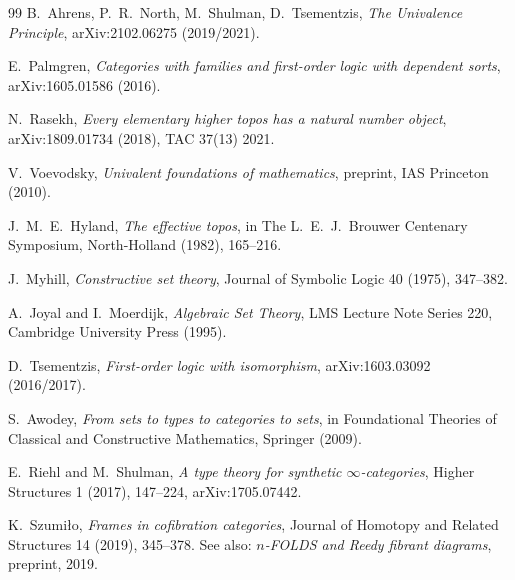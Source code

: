 \documentclass[12pt]{article}
\theoremstyle{definition}
\theoremstyle{remark}
\begin{document}
\begin{thebibliography}{99}
B.\ Ahrens, P.\ R.\ North, M.\ Shulman, D.\ Tsementzis,
\emph{The Univalence Principle},
arXiv:2102.06275 (2019/2021).

E.\ Palmgren,
\emph{Categories with families and first-order logic with dependent sorts},
arXiv:1605.01586 (2016).

N.\ Rasekh,
\emph{Every elementary higher topos has a natural number object},
arXiv:1809.01734 (2018), TAC 37(13) 2021.

V.\ Voevodsky,
\emph{Univalent foundations of mathematics},
preprint, IAS Princeton (2010).

J.\ M.\ E.\ Hyland,
\emph{The effective topos},
in The L.\ E.\ J.\ Brouwer Centenary Symposium, North-Holland (1982), 165--216.

J.\ Myhill,
\emph{Constructive set theory},
Journal of Symbolic Logic 40 (1975), 347--382.

A.\ Joyal and I.\ Moerdijk,
\emph{Algebraic Set Theory},
LMS Lecture Note Series 220, Cambridge University Press (1995).

D.\ Tsementzis,
\emph{First-order logic with isomorphism},
arXiv:1603.03092 (2016/2017).

S.\ Awodey,
\emph{From sets to types to categories to sets},
in Foundational Theories of Classical and Constructive Mathematics, Springer (2009).

E.\ Riehl and M.\ Shulman,
\emph{A type theory for synthetic $\infty$-categories},
Higher Structures 1 (2017), 147--224, arXiv:1705.07442.

K.\ Szumi\l{}o,
\emph{Frames in cofibration categories},
Journal of Homotopy and Related Structures 14 (2019), 345--378.
See also: \emph{$n$-FOLDS and Reedy fibrant diagrams},
preprint, 2019.

\end{thebibliography}
\end{document}
